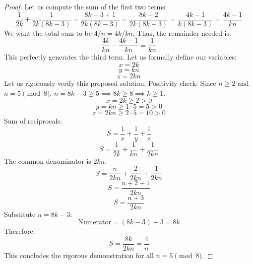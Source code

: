 \documentclass[12pt,a4paper]{article}
\begin{document}
\begin{proof}
Let us compute the sum of the first two terms:
\begin{equation}
\frac{1}{2k} + \frac{1}{2k(8k-3)} = \frac{8k-3+1}{2k(8k-3)} = \frac{8k-2}{2k(8k-3)} = \frac{4k-1}{k(8k-3)} = \frac{4k-1}{kn}
\end{equation}
We want the total sum to be $4/n = 4k/kn$.
Thus, the remainder needed is:
\begin{equation}
\frac{4k}{kn} - \frac{4k-1}{kn} = \frac{1}{kn}
\end{equation}
This perfectly generates the third term. Let us formally define our variables:
\begin{equation}
x = 2k
\end{equation}
\begin{equation}
y = kn
\end{equation}
\begin{equation}
z = 2kn
\end{equation}
Let us rigorously verify this proposed solution.
Positivity check: Since $n \geq 2$ and $n = 5 \pmod 8$, $n = 8k - 3 \ge 5 \implies 8k \ge 8 \implies k \ge 1$.
\begin{equation}
x = 2k \geq 2 > 0
\end{equation}
\begin{equation}
y = kn \geq 1 \cdot 5 = 5 > 0
\end{equation}
\begin{equation}
z = 2kn \geq 2 \cdot 5 = 10 > 0
\end{equation}
Sum of reciprocals:
\begin{equation}
S = \frac{1}{x} + \frac{1}{y} + \frac{1}{z}
\end{equation}
\begin{equation}
S = \frac{1}{2k} + \frac{1}{kn} + \frac{1}{2kn}
\end{equation}
The common denominator is $2kn$.
\begin{equation}
S = \frac{n}{2kn} + \frac{2}{2kn} + \frac{1}{2kn}
\end{equation}
\begin{equation}
S = \frac{n + 2 + 1}{2kn}
\end{equation}
\begin{equation}
S = \frac{n + 3}{2kn}
\end{equation}
Substitute $n = 8k - 3$:
\begin{equation}
\text{Numerator} = (8k - 3) + 3 = 8k
\end{equation}
Therefore:
\begin{equation}
S = \frac{8k}{2kn} = \frac{4}{n}
\end{equation}
This concludes the rigorous demonstration for all $n = 5 \pmod 8$.
\end{proof}
\end{document}
